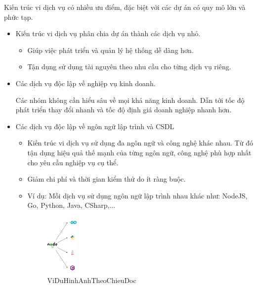Kiến trúc vi dịch vụ có nhiều ưu điểm, đặc biệt với các dự án có quy mô lớn và phức tạp.

\begin{itemize}

    \item Kiến trúc vi dịch vụ phân chia dự án thành các dịch vụ nhỏ.

          \begin{itemize}

              \item Giúp việc phát triển và quản lý hệ thống dễ dàng hơn.

              \item Tận dụng sử dụng tài nguyên theo nhu cầu cho từng dịch vụ riêng.


          \end{itemize}
    \item Các dịch vụ độc lập về nghiệp vụ kinh doanh.
    
    Các nhóm không cần hiểu sâu về mọi khả năng kinh doanh.      Dẫn tới tốc độ phát triển thay đổi nhanh và   tốc độ định giá doanh nghiệp nhanh hơn.
    
    \item Các dịch vụ độc lập về         ngôn ngữ lập trình và CSDL
    \begin{itemize}

        \item     Kiến trúc vi dịch vụ sử dụng đa ngôn ngữ và công nghệ khác nhau. Từ đó tận dụng hiệu quả thế mạnh của từng ngôn ngữ, công nghệ phù hợp nhất cho yêu cầu nghiệp vụ cụ thể.   

        \item        Giảm chi phí và thời gian kiểm thử do ít ràng buộc.
        \item Ví dụ: Mỗi dịch vụ sử dụng ngôn ngữ lập trình nhau khác như: NodeJS, Go, Python, Java, CSharp,...
        
        
        
         
        \begin{figure}[h] 
        \centering
        \includegraphics[height=3cm]{pictures/DaNgonNgu/_DaNgonNgu.png}
        \caption{ViDuHinhAnhTheoChieuDoc}  
        \end{figure} 
        
       


        
        
        


    \end{itemize}
\end{itemize}

